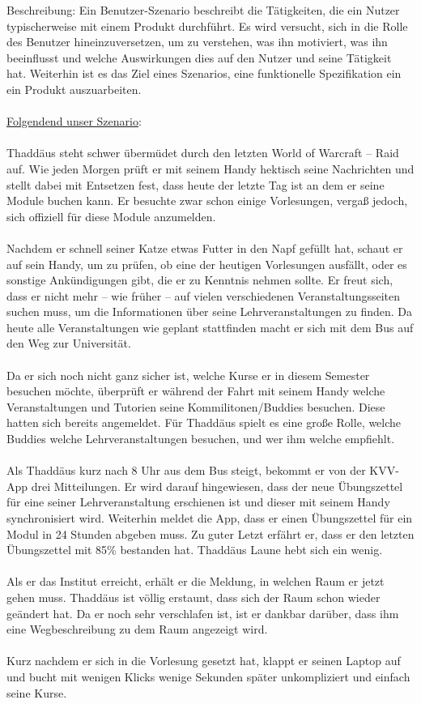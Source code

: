 \documentclass{article}
\begin{document}
Beschreibung: Ein Benutzer-Szenario beschreibt die Tätigkeiten, die ein Nutzer typischerweise mit einem Produkt durchführt. Es wird versucht, sich in die Rolle des Benutzer hineinzuversetzen, um zu verstehen, was ihn motiviert, was ihn beeinflusst und welche Auswirkungen dies auf den Nutzer und seine Tätigkeit hat. Weiterhin ist es das Ziel eines Szenarios, eine funktionelle Spezifikation ein ein Produkt auszuarbeiten. \\
\\
\underline{Folgendend unser Szenario}:\\
\\
Thaddäus steht schwer übermüdet durch den letzten World of Warcraft – Raid auf. Wie jeden Morgen prüft er mit seinem Handy hektisch seine Nachrichten und stellt dabei mit Entsetzen fest, dass heute der letzte Tag ist an dem er seine Module buchen kann. Er besuchte zwar schon einige Vorlesungen, vergaß jedoch, sich offiziell für diese Module anzumelden.\\
\\
Nachdem er schnell seiner Katze etwas Futter in den Napf gefüllt hat, schaut er auf sein Handy, um zu prüfen, ob eine der heutigen Vorlesungen ausfällt, oder es sonstige Ankündigungen gibt, die er zu Kenntnis nehmen sollte. Er freut sich, dass er nicht mehr – wie früher – auf vielen verschiedenen Veranstaltungsseiten suchen muss, um die Informationen über seine Lehrveranstaltungen zu finden. Da heute alle Veranstaltungen wie geplant stattfinden macht er sich mit dem Bus auf den Weg zur Universität.\\
\\
Da er sich noch nicht ganz sicher ist, welche Kurse er in diesem Semester besuchen möchte, überprüft er während der Fahrt mit seinem Handy welche Veranstaltungen und Tutorien seine Kommilitonen/Buddies besuchen. Diese hatten sich bereits angemeldet. Für Thaddäus spielt es eine große Rolle, welche Buddies welche Lehrveranstaltungen besuchen, und wer ihm welche empfiehlt.\\
\\
Als Thaddäus kurz nach 8 Uhr aus dem Bus steigt, bekommt er von der KVV-App drei Mitteilungen. Er wird darauf hingewiesen, dass der neue Übungszettel für eine seiner Lehrveranstaltung erschienen ist und dieser mit seinem Handy synchronisiert wird. Weiterhin meldet die App, dass er einen Übungszettel für ein Modul in 24 Stunden abgeben muss. Zu guter Letzt erfährt er, dass er den letzten Übungszettel mit 85\% bestanden hat. Thaddäus Laune hebt sich ein wenig.\\
\\
Als er das Institut erreicht, erhält er die Meldung, in welchen Raum er jetzt gehen muss. Thaddäus ist völlig erstaunt, dass sich der Raum schon wieder geändert hat. Da er noch sehr verschlafen ist, ist er dankbar darüber, dass ihm eine Wegbeschreibung zu dem Raum angezeigt wird.\\
\\
Kurz nachdem er sich in die Vorlesung gesetzt hat, klappt er seinen Laptop auf und bucht mit wenigen Klicks wenige Sekunden später unkompliziert und einfach seine Kurse.
\end{document}
